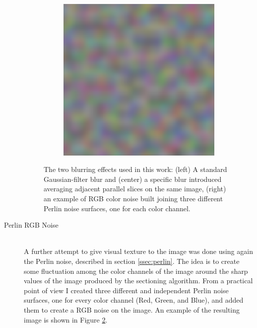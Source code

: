 \begin{description}
\begin{figure}
\begin{subfigure}[t]{0.2\textwidth}
                 \caption{}
                 \label{fig:av_blur}
            \end{subfigure}
            \quad
            \begin{subfigure}[t]{0.2\textwidth}
                 \centering
                 \includegraphics[width = \textwidth]{images/rgb_prlin}
                 \caption{}
                 \label{fig:rgb_prlin}
            \end{subfigure}

            \caption{The two blurring effects used in this work: (left) A standard Gaussian-filter blur and (center) a specific blur introduced averaging adjacent parallel slices on the same image, (right) an example of RGB color noise built joining three different Perlin noise surfaces, one for each color channel.}
            \label{fig:blur_effect}
        \end{figure}

        \item [Perlin RGB Noise] \hfill \\
        A further attempt to give visual texture to the image was done using again the Perlin noise, described in section \ref{ssec:perlin}. The idea is to create some fluctuation among the color channels of the image around the sharp values of the image produced by the sectioning algorithm.
        From a practical point of view I created three different and independent Perlin noise surfaces, one for every color channel (Red, Green, and Blue), and added them to create a RGB noise on the image. An example of the resulting image is shown in Figure \ref{fig:rgb_prlin}.


\end{description}
